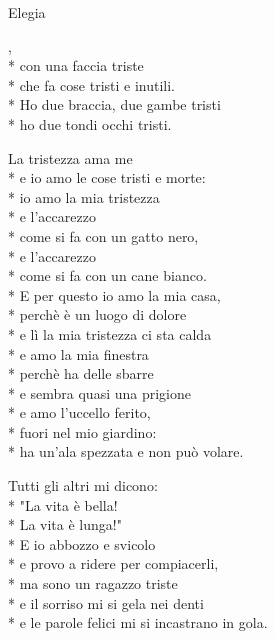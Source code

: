 \documentclass[12pt]{book}
\begin{document}
\begin{poem}{Elegia}{}
\begin{changemargin}{-1cm}{-2cm}
\settowidth{\versewidth}{non meno è ciò che meriti.}

\begin{altverse}
,\\*
con una faccia triste\\*
che fa cose tristi e inutili.\\*
Ho due braccia, due gambe tristi\\*
ho due tondi occhi tristi.
\end{altverse}

\begin{altverse}
La tristezza ama me\\*
e io amo le cose tristi e morte:\\*
io amo la mia tristezza\\*
e l'accarezzo\\*
come si fa con un gatto nero,\\*
e l'accarezzo\\*
come si fa con un cane bianco.\\*
E per questo io amo la mia casa,\\*
perchè è un luogo di dolore\\*
e lì la mia tristezza ci sta calda\\*
e amo la mia finestra\\*
perchè ha delle sbarre\\*
e sembra quasi una prigione\\*
e amo l'uccello ferito,\\*
fuori nel mio giardino:\\*
ha un'ala spezzata e non può volare.
\end{altverse}

\begin{altverse}
Tutti gli altri mi dicono:\\*
"La vita è bella!\\*
La vita è lunga!"\\*
E io abbozzo e svicolo\\*
e provo a ridere per compiacerli,\\*
ma sono un ragazzo triste\\*
e il sorriso mi si gela nei denti\\*
e le parole felici mi si incastrano in gola.
\end{altverse}


\end{changemargin}
\end{poem}
\end{document}
